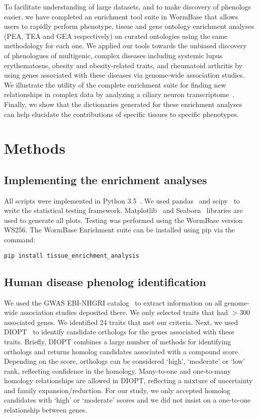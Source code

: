 To facilitate understanding of large datasets, and to make discovery of
phenologs easier, we have completed an enrichment tool suite in WormBase
that allows users to rapidly perform phenotype, tissue and gene ontology
enrichment analyses (PEA, TEA and GEA respectively) on curated \cel{} ontologies
using the same methodology for each one.
We applied our tools towards the unbiased discovery of phenologues of
multigenic, complex diseases including
systemic lupus erythematosus, obesity and obesity-related traits,  and
rheumatoid arthritis
by using genes associated with these
diseases via genome-wide association studies. We illustrate the utility of
the complete enrichment suite for finding new relationships in complex data by
analyzing a ciliary neuron transcriptome~\citep{Wang2015}. Finally, we show that
the dictionaries generated for these enrichment analyses can help elucidate the
contributions of specific tissues to specific phenotypes.

\section*{Methods}
\subsection*{Implementing the enrichment analyses}
All scripts were implemented in Python 3.5~\citep{Rossum2011}. We used
pandas~\citep{McKinney2011} and scipy~\citep{Oliphant2007} to write the
statistical testing framework. Matplotlib~\citep{Hunter2007} and Seaborn~\citep{Waskom}
libraries are used to generate all plots. Testing was performed using the
WormBase version WS256. The WormBase Enrichment suite can be installed using
pip via the command:

\texttt{pip install tissue\_enrichment\_analysis}


\subsection*{Human disease phenolog identification}
We used the GWAS EBI-NHGRI catalog~\citep{MacArthur2016} to extract information
on all genome-wide
association studies deposited there. We only selected traits that had $>300$
associated genes. We identified 24 traits that met our criteria. Next, we used
DIOPT~\citep{Hu2011} to identify candidate orthologs for the genes associated with these
traits. Briefly, DIOPT combines a large number of methods for identifying orthologs
and returns homolog candidates associated with a compound score. Depending on the score,
orthologs can be considered `high', `moderate' or `low' rank, reflecting confidence
in the homology. Many-to-one and one-to-many homology relationships are allowed
in DIOPT, reflecting a mixture of uncertainty and family expansion/reduction.
For our study, we only accepted homolog candidates with `high' or `moderate' scores
and we did not insist on a one-to-one relationship between genes.

